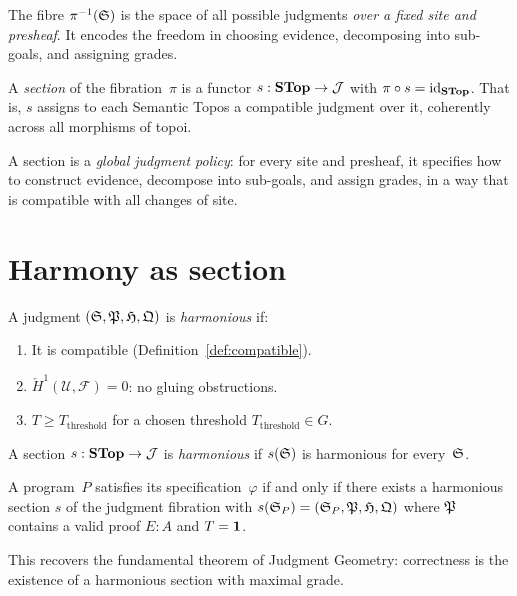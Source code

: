 The fibre $\pi^{-1}(\mathfrak{S})$ is the space of all possible judgments
\emph{over a fixed site and presheaf}.  It encodes the freedom in
choosing evidence, decomposing into sub-goals, and assigning grades.

\begin{definition}[Section]
\label{def:section}
A \emph{section} of the fibration~$\pi$ is a functor
$s : \mathbf{STop} \to \mathcal{J}$ with $\pi \circ s = \mathrm{id}_{\mathbf{STop}}$.
That is, $s$ assigns to each Semantic Topos a compatible judgment
over it, coherently across all morphisms of topoi.
\end{definition}

\begin{remark}
A section is a \emph{global judgment policy}: for every site and
presheaf, it specifies how to construct evidence, decompose into
sub-goals, and assign grades, in a way that is compatible with
all changes of site.
\end{remark}

\section{Harmony as section}
\label{sec:harmony-section}

\begin{definition}
\label{def:harmonious}
A judgment $(\mathfrak{S}, \mathfrak{P}, \mathfrak{H}, \mathfrak{Q})$ is \emph{harmonious} if:
\begin{enumerate}[label=(\alph*),nosep]
\item It is compatible (Definition~\ref{def:compatible}).
\item $\check{H}^1(\mathcal{U}, \mathcal{F}) = 0$: no gluing
  obstructions.
\item $T \geq T_{\mathrm{threshold}}$ for a chosen threshold
  $T_{\mathrm{threshold}} \in G$.
\end{enumerate}
A section $s : \mathbf{STop} \to \mathcal{J}$ is \emph{harmonious} if $s(\mathfrak{S})$
is harmonious for every~$\mathfrak{S}$.
\end{definition}

\begin{proposition}
\label{prop:harmony-section}
A program~$P$ satisfies its specification~$\varphi$ if and only if there
exists a harmonious section $s$ of the judgment fibration with
$s(\mathfrak{S}_P) = (\mathfrak{S}_P, \mathfrak{P}, \mathfrak{H}, \mathfrak{Q})$ where $\mathfrak{P}$ contains
a valid proof $E : A$ and $T = \mathbf{1}$.
\end{proposition}

This recovers the fundamental theorem of Judgment Geometry: correctness
is the existence of a harmonious section with maximal grade.


